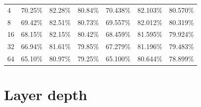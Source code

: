 \begin{table}[H]
\begin{tabular}{lllllll}
4          & 70.25\%     & 82.28\%                                                                       & \multicolumn{1}{l|}{80.84\%}                                                                       & 70.438\%    & 82.103\%                                                                   & 80.570\%                                                                \\
8          & 69.42\%     & 82.51\%                                                                       & \multicolumn{1}{l|}{80.73\%}                                                                       & 69.557\%    & 82.012\%                                                                   & 80.319\%                                                                \\
16         & 68.15\%     & 82.15\%                                                                       & \multicolumn{1}{l|}{80.42\%}                                                                       & 68.459\%    & 81.595\%                                                                   & 79.924\%                                                                \\
32         & 66.94\%     & 81.61\%                                                                       & \multicolumn{1}{l|}{79.85\%}                                                                       & 67.279\%    & 81.196\%                                                                   & 79.483\%                                                                \\
64         & 65.10\%     & 80.97\%                                                                       & \multicolumn{1}{l|}{79.25\%}                                                                       & 65.100\%    & 80.644\%                                                                   & 78.899\%                                                               
\end{tabular}
\end{table}

\section*{Layer depth}

